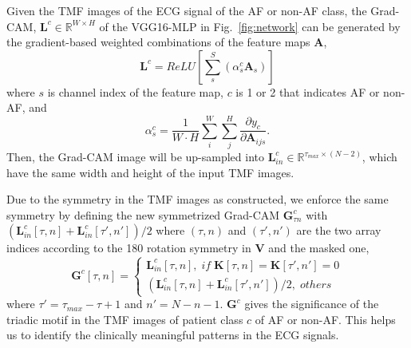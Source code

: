 \documentclass[journal]{IEEEtran}
\begin{document}
Given the TMF images of the ECG signal of the AF or non-AF class, the Grad-CAM, $\mathbold{L}^c\in \mathbb{R}^{W\times H}$ of the VGG16-MLP in Fig.~\ref{fig:network} can be generated by the gradient-based weighted combinations of the feature maps $\mathbold{A}$,
\begin{equation}
  \mathbold{L}^c = ReLU[\sum_s^S(\alpha^c_s \mathbold{A}_s)]
\label{equ:grad-cam-1}
\end{equation}
where $s$ is channel index of the feature map, $c$ is 1 or 2 that indicates AF or non-AF, and
\begin{equation}
  \alpha^c_s=\frac{1}{W\cdot H}\sum_i^W\sum_j^H\frac{\partial y_c}{\partial \mathbold{A}_{ijs}}.
\label{equ:grad-cam-2}
\end{equation}
Then, the Grad-CAM image will be up-sampled into $\mathbold{L}_{in}^c \in \mathbb{R}^{\tau_{max}\times (N-2)}$, which have the same width and height of the input TMF images. 

Due to the symmetry in the TMF images as constructed, we enforce the same symmetry by defining the new symmetrized Grad-CAM $\mathbold{G}^c_{\tau n}$ with $(\mathbold{L}_{in}^c[\tau, n]+\mathbold{L}_{in}^c[\tau',n'])/2$ where $(\tau,n)$ and $(\tau',n')$ are the two array indices according to the 180 rotation symmetry in $\mathbold{V}$ and the masked one,
\begin{equation}
  \mathbold{G}^c[\tau, n] = 
  \begin{cases}
  \mathbold{L}_{in}^c[\tau, n] , \; if\; \mathbold{K}[\tau, n] = \mathbold{K}[\tau', n'] =0 \\
  (\mathbold{L}_{in}^c[\tau, n] + \mathbold{L}_{in}^c[\tau', n'])/2,\; others \;
  \end{cases}
\end{equation}
where $\tau'=\tau_{max}-\tau+1$ and $n'=N-n-1$. 
$\mathbold{G}^c$ gives the significance of the triadic motif in the TMF images of patient class $c$ of AF or non-AF. This helps us to identify the clinically meaningful patterns in the ECG signals.
\end{document}

